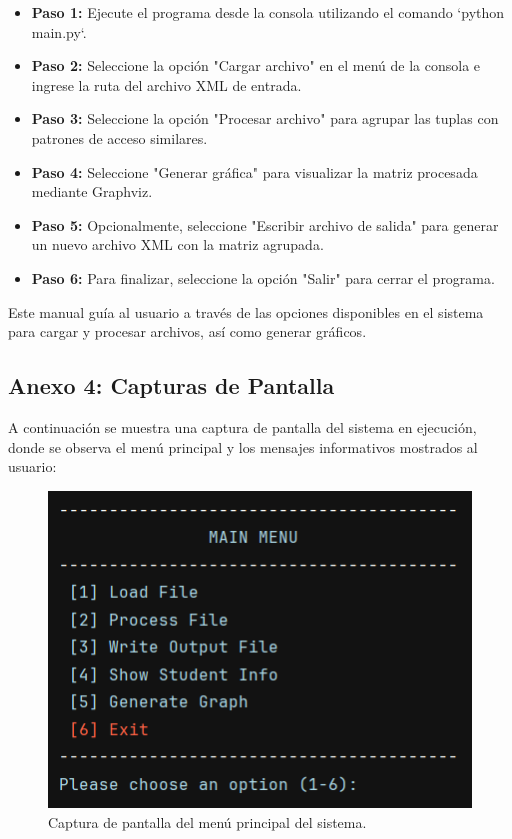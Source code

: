 \documentclass[letterpaper,12pt]{article}
\begin{document}
\begin{multicols}{2}
    \begin{itemize}
        \item \textbf{Paso 1:} Ejecute el programa desde la consola utilizando el comando `python main.py`.
        \item \textbf{Paso 2:} Seleccione la opción "Cargar archivo" en el menú de la consola e ingrese la ruta del archivo XML de entrada.
        \item \textbf{Paso 3:} Seleccione la opción "Procesar archivo" para agrupar las tuplas con patrones de acceso similares.
        \item \textbf{Paso 4:} Seleccione "Generar gráfica" para visualizar la matriz procesada mediante Graphviz.
        \item \textbf{Paso 5:} Opcionalmente, seleccione "Escribir archivo de salida" para generar un nuevo archivo XML con la matriz agrupada.
        \item \textbf{Paso 6:} Para finalizar, seleccione la opción "Salir" para cerrar el programa.
    \end{itemize}

    Este manual guía al usuario a través de las opciones disponibles en el sistema para cargar y procesar archivos, así como generar gráficos.

    \subsection*{Anexo 4: Capturas de Pantalla}
    A continuación se muestra una captura de pantalla del sistema en ejecución, donde se observa el menú principal y los mensajes informativos mostrados al usuario:

    \begin{figure}[H]
        \centering
        \includegraphics[width=\columnwidth]{images/screenshot_menu.png}
        \caption{Captura de pantalla del menú principal del sistema.}
    \end{figure}


\end{multicols}
\end{document}
